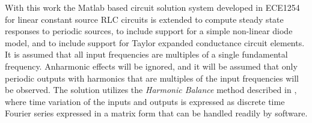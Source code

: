 With this work the Matlab based circuit solution system developed in ECE1254 for linear constant source RLC circuits is extended to compute steady state responses to periodic sources, to include support for a simple non-linear diode model, and to include support for Taylor expanded conductance circuit elements.
It is assumed that all input frequencies are multiples of a single fundamental frequency.
Anharmonic effects will be ignored, and it will be assumed that only periodic outputs with harmonics that are multiples of the input frequencies will be observed.
The solution utilizes the \emph{Harmonic Balance} method described in \citep{giannini2004NonlinearMicrowaveCircuitDesign}, where
time variation of the inputs and outputs is expressed as discrete time Fourier series expressed in a matrix form that can be handled readily by software.
